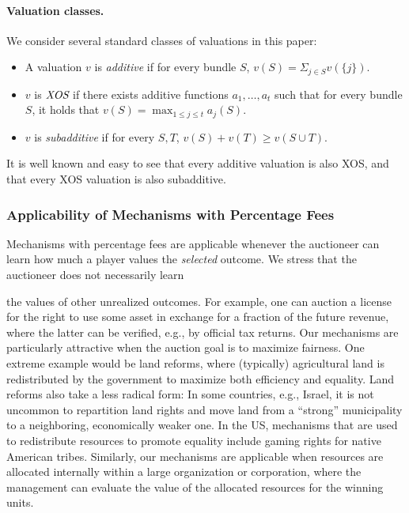 \documentclass{article}
\begin{document}
\paragraph{Valuation classes.} We consider several standard classes of valuations in this paper: 
\begin{itemize}
\item A valuation $v$ is \emph{additive} if for every bundle $S$, $v(S)=\Sigma_{j\in S}v(\{j\})$.
\item $v$ is $\emph{XOS}$ if there exists additive functions $a_1,\ldots, a_t$ such that for every bundle $S$, it holds that $v(S)=\max_{1\leq j\leq t}a_j(S)$.
\item $v$ is \emph{subadditive} if for every $S,T$, $v(S)+v(T) \geq v(S\cup T)$. 
\end{itemize}

It is well known and easy to see that every additive valuation is also XOS, and that every XOS valuation is also subadditive.

\subsubsection*{Applicability of Mechanisms with Percentage Fees}

Mechanisms with percentage fees are applicable whenever the auctioneer can learn how much a player values the \emph{selected} outcome. We stress that 
the auctioneer does not necessarily learn

the values of other unrealized outcomes. For example, one can auction a license for the right to use some asset in exchange for a fraction of the future revenue, where the latter can be verified, e.g., by official tax returns. Our mechanisms are particularly attractive when the auction goal is to maximize fairness. One extreme example would be land reforms, where (typically) agricultural land is redistributed by the government to maximize both efficiency and equality. Land reforms also take a less radical form: In some countries, e.g., Israel, it is not uncommon to repartition land rights and move land from a ``strong'' municipality to a neighboring, economically weaker one. In the US, mechanisms that are used to redistribute resources to promote equality include gaming rights for native American tribes. Similarly, our mechanisms are applicable when resources are allocated internally within a large organization or corporation, where the management can evaluate the value of the allocated resources for the winning units.
\end{document}
